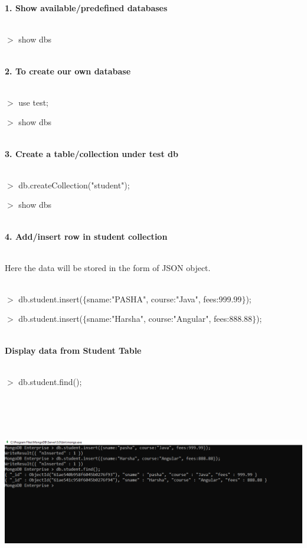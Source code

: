 \documentclass{article}
\begin{document}
\noindent \\ \textbf{}

\noindent 

\noindent \\ \textbf{1. Show available/predefined databases}

\noindent \\ $\mathrm{>}$ show dbs

\noindent 

\noindent \\ \textbf{2. To create our own database}

\noindent \\ $\mathrm{>}$ use test;

\noindent $\mathrm{>}$ show dbs

\noindent 
\newpage
\noindent \\ \textbf{3. Create a table/collection under test db}

\noindent \\ $\mathrm{>}$ db.createCollection("student");

\noindent $\mathrm{>}$ show dbs

\noindent 

\noindent \\ \textbf{4. Add/insert row in student collection}

\noindent \\ Here the data will be stored in the form of JSON object.

\noindent 

\noindent \\ $\mathrm{>}$ db.student.insert($\mathrm{\{}$sname:"PASHA", course:"Java", fees:999.99$\mathrm{\}}$);   

\noindent $\mathrm{>}$ db.student.insert($\mathrm{\{}$sname:"Harsha", course:"Angular", fees:888.88$\mathrm{\}}$);

\noindent 

\noindent \\ \textbf{Display data from Student Table}

\noindent \\ $\mathrm{>}$ db.student.find();

\noindent 

\noindent 

\begin{center}
	\noindent \includegraphics*[width=7.08in, height=3.37in]{IMG-04-04}
\end{center}
\end{document}
